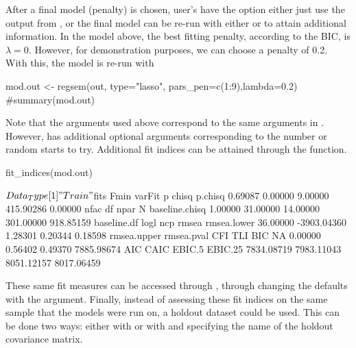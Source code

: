 \documentclass[article]{jss}
\begin{document}
After a final model (penalty) is chosen, user's have the option either
just use the output from , or the final model can be
re-run with either  or  to attain
additional information. In the model above, the best fitting penalty,
according to the BIC, is \(\lambda=0\). However, for demonstration
purposes, we can choose a penalty of 0.2. With this, the model is re-run
with 

\begin{CodeChunk}
\begin{CodeInput}
mod.out <- regsem(out, type="lasso", pars_pen=c(1:9),lambda=0.2)
#summary(mod.out)
\end{CodeInput}
\end{CodeChunk}

Note that the arguments used above correspond to the same arguments in
. However,  has additional
optional arguments corresponding to the number or random starts to try.
Additional fit indices can be attained through the 
function.

\begin{CodeChunk}
\begin{CodeInput}
fit_indices(mod.out)
\end{CodeInput}
\begin{CodeOutput}
$Data_Type
[1] "Train"

$fits
          Fmin         varFit              p          chisq        p.chisq 
       0.69087        0.00000        9.00000      415.90286        0.00000 
          nfac             df           npar              N baseline.chisq 
       1.00000       31.00000       14.00000      301.00000      918.85159 
   baseline.df           logl            ncp          rmsea    rmsea.lower 
      36.00000    -3903.04360        1.28301        0.20344        0.18598 
   rmsea.upper     rmsea.pval            CFI            TLI            BIC 
            NA        0.00000        0.56402        0.49370     7885.98674 
           AIC           CAIC         EBIC.5        EBIC.25 
    7834.08719     7983.11043     8051.12157     8017.06459 
\end{CodeOutput}
\end{CodeChunk}

\noindent
These same fit measures can be accessed through ,
through changing the defaults with the 
argument. Finally, instead of assessing these fit indices on the same
sample that the models were run on, a holdout dataset could be used.
This can be done two ways: either with
 or with
 and specifying the name of the
holdout covariance matrix.
\end{document}
